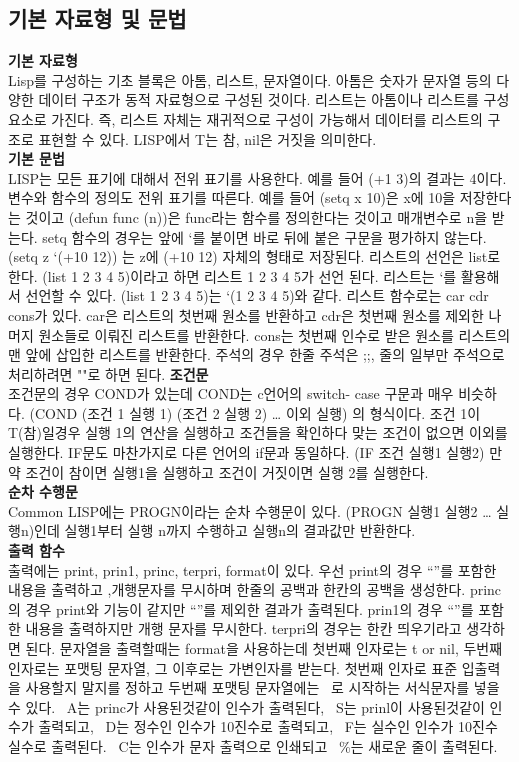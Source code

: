 \documentclass{article}
\begin{document}
\subsection{기본 자료형 및 문법}
{\bf 기본 자료형}\\
Lisp를 구성하는 기초 블록은 아톰, 리스트, 문자열이다.  아톰은 숫자가 문자열 등의 다양한 데이터 구조가 동적 자료형으로 구성된 것이다. 리스트는 아톰이나 리스트를 구성 요소로 가진다. 즉, 리스트 자체는 재귀적으로 구성이 가능해서 데이터를 리스트의 구조로 표현할 수 있다. LISP에서 T는 참, nil은 거짓을 의미한다.\\
{\bf 기본 문법}\\
LISP는 모든 표기에 대해서 전위 표기를 사용한다. 예를 들어 (+1 3)의 결과는 4이다. 변수와 함수의 정의도 전위 표기를 따른다. 예를 들어 (setq x 10)은 x에 10을 저장한다는 것이고 (defun func (n))은 func라는 함수를 정의한다는 것이고 매개변수로 n을 받는다. setq 함수의 경우는 앞에 ‘를 붙이면 바로 뒤에 붙은 구문을 평가하지 않는다. (setq z ‘(+10 12)) 는 z에 (+10 12) 자체의 형태로 저장된다. 리스트의 선언은 list로 한다. (list 1 2 3 4 5)이라고 하면 리스트 1 2 3 4 5가 선언 된다. 리스트는 ‘를 활용해서 선언할 수 있다. (list 1 2 3 4 5)는 ‘(1 2 3 4 5)와 같다. 리스트 함수로는 car cdr cons가 있다. car은 리스트의 첫번째 원소를 반환하고 cdr은 첫번째 원소를 제외한 나머지 원소들로 이뤄진 리스트를 반환한다. cons는 첫번째 인수로 받은 원소를 리스트의 맨 앞에 삽입한 리스트를 반환한다. 주석의 경우 한줄 주석은  ;;, 줄의 일부만 주석으로 처리하려면 ""로 하면 된다. 
\newpage
{\bf 조건문}\\
조건문의 경우 COND가 있는데 COND는 c언어의 switch- case 구문과 매우 비슷하다. (COND (조건 1 실행 1) (조건 2 실행 2) … 이외 실행) 의 형식이다. 조건 1이 T(참)일경우 실행 1의 연산을 실행하고 조건들을 확인하다 맞는 조건이 없으면 이외를 실행한다. IF문도 마찬가지로 다른 언어의 if문과 동일하다. (IF 조건 실행1 실행2) 만약 조건이 참이면 실행1을 실행하고 조건이 거짓이면 실행 2를 실행한다.\\ 
{\bf 순차 수행문}\\
Common LISP에는 PROGN이라는 순차 수행문이 있다. (PROGN 실행1 실행2 … 실행n)인데 실행1부터 실행 n까지 수행하고 실행n의 결과값만 반환한다. \\
{\bf 출력 함수}\\
출력에는 print, prin1, princ, terpri, format이 있다. 우선 print의 경우 “”를 포함한 내용을 출력하고 ,개행문자를 무시하며 한줄의 공백과 한칸의 공백을 생성한다. princ의 경우 print와 기능이 같지만 “”를 제외한 결과가 출력된다. prin1의 경우 “”를 포함한 내용을 출력하지만 개행 문자를 무시한다. terpri의 경우는 한칸 띄우기라고 생각하면 된다. 문자열을 출력할때는 format을 사용하는데 첫번째 인자로는 t or nil, 두번째 인자로는 포맷팅 문자열, 그 이후로는 가변인자를 받는다. 첫번째 인자로 표준 입출력을 사용할지 말지를 정하고 두번째 포맷팅 문자열에는 ~로 시작하는 서식문자를 넣을 수 있다. ~A는 princ가 사용된것같이 인수가 출력된다, ~S는 prinl이 사용된것같이 인수가 출력되고, ~D는 정수인 인수가 10진수로 출력되고, ~F는 실수인 인수가 10진수 실수로 출력된다. ~C는 인수가 문자 출력으로 인쇄되고 ~\%는 새로운 줄이 출력된다. \\
\end{document}
